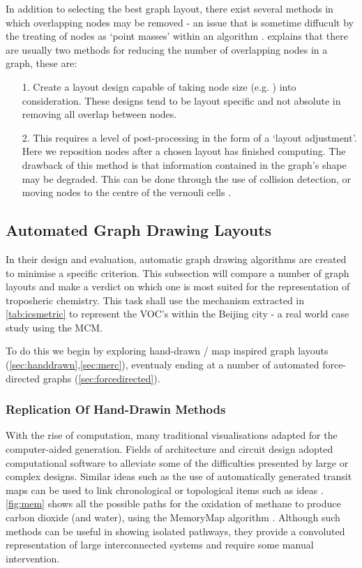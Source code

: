 In addition to selecting the best graph layout, there exist several methods in which overlapping nodes may be removed - an issue that is sometime diffucult by the treating of nodes as `point masses' within an algorithm \citep{nodeoverlap}. \cite{IPSEPCOLA} explains that there are usually two methods for reducing the number of overlapping nodes in a graph, these are:


\begin{itemize}
\item [1.] Create a layout design capable of taking node size (e.g. \citep{nons}) into consideration. These designs tend to be layout specific and not absolute in removing all overlap between nodes. 
\item [2.] This requires a level of post-processing in the form of a `layout adjustment'. Here we reposition nodes after a chosen layout has finished computing. The drawback of this method is that information contained in the graph's shape may be degraded. This can be done through the use of collision detection, or moving nodes to the centre of the vernouli cells \citep{novern}. 
\end{itemize}




\subsection{Automated Graph Drawing Layouts}\label{sec:drawing}


In their design and evaluation, automatic graph drawing algorithms are created to minimise a specific criterion. This subsection will compare a number of graph layouts and make a verdict on which one is most suited for the representation of troposheric chemistry. This task shall use the mechanism extracted in \autoref{tab:icsmetric} to represent the VOC's within the Beijing city - a real world case study using the MCM. 

To do this we begin by exploring hand-drawn / map inspired graph layouts (\autoref{sec:handdrawn},\autoref{sec:merc}), eventualy ending at a number of  automated force-directed graphs (\autoref{sec:forcedirected}).


\subsubsection{Replication Of Hand-Drawin Methods}\label{sec:handdrawn}
With the rise of computation, many traditional visualisations adapted for the computer-aided generation. Fields of architecture and circuit design adopted computational software to alleviate some of the difficulties presented by large or complex designs. Similar ideas such as the use of automatically generated transit maps can be used to link chronological or topological items such as ideas \citep{memory}. \autoref{fig:mem} shows all the possible paths for the oxidation of methane to produce carbon dioxide (and water), using the MemoryMap algorithm \cite{memory}. Although such methods can be useful in showing isolated pathways, they provide a convoluted representation of large interconnected systems and require some manual intervention. 


